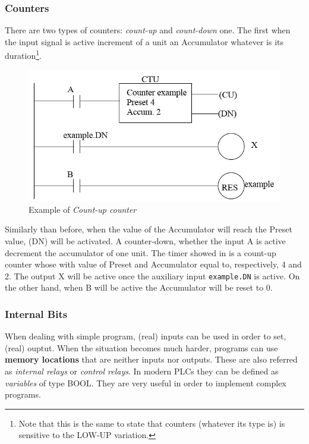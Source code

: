 \subsubsection{Counters}
There are two types of counters: \textit{count-up} and \textit{count-down} one. The first when the input signal is active increment of a unit an Accumulator whatever is its duration\footnote{
    Note that this is the same to state that counters (whatever its type is) is sensitive to the LOW-UP variation.
}.

\begin{figure}
    \centering
    \includegraphics[scale=0.7]{img/CTU_ladder_counter.png}
    \caption{Example of \textit{Count-up counter}}
    \label{fig:CTU}
\end{figure}

Similarly than before, when the value of the Accumulator will reach the Preset value, (DN) will be activated. A counter-down, whether the input A is active decrement the accumulator of one unit. The timer showed in  is a count-up counter whose with value of Preset and Accumulator equal to, respectively, 4 and 2. The output X will be active once the auxiliary input \texttt{example.DN} is active. On the other hand, when B will be active the Accumulator will be reset to 0.

\subsubsection{Internal Bits}
When dealing with simple program, (real) inputs can be used in order to set, (real) ouptut. When the situation becomes much harder, programs can use \textbf{memory locations} that are neither inputs nor outputs. These are also referred as \textit{internal relays} or \textit{control relays}. In modern PLCs they can be defined as \textit{variables} of type BOOL. They are very useful in order to implement complex programs.

